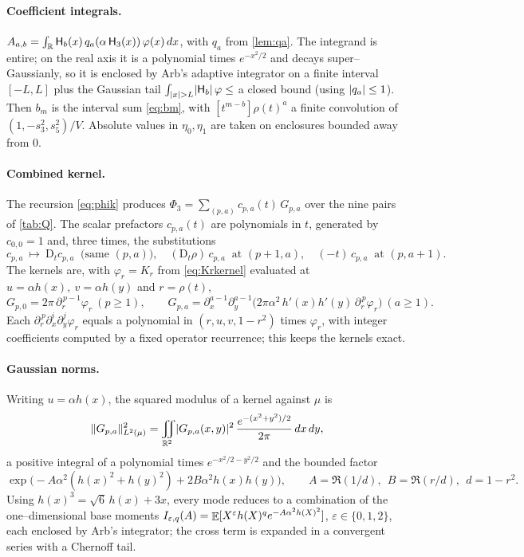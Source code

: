 \documentclass[12pt]{article}
\newcommand{\He}{\mathsf{H}}                 %
\newcommand{\Dop}{\mathrm{D}}              %
\newcommand{\Kr}{K}                          %
\begin{document}
\paragraph{Coefficient integrals.}
$A_{a,b}=\int_\R \He_b(x)\,q_a(\alpha\,\He_3(x))\,\varphi(x)\,dx$, with $q_a$ from
\cref{lem:qa}.  The integrand is entire; on the real axis it is a polynomial
times $e^{-x^2/2}$ and decays super--Gaussianly, so it is enclosed by Arb's
adaptive integrator on a finite interval $[-L,L]$ plus the Gaussian tail
$\int_{\abs x>L}\abs{\He_b}\,\varphi\le$ a closed bound (using $\lvert q_a\rvert\le1$).
Then $b_m$ is the interval sum \eqref{eq:bm}, with $[t^{m-b}]\rho(t)^a$ a finite
convolution of $(1,-s_3^2,s_5^2)/V$.  Absolute values in $\eta_0,\eta_1$ are taken
on enclosures bounded away from $0$.

\paragraph{Combined kernel.}
The recursion \eqref{eq:phik} produces $\Phi_3=\sum_{(p,a)}c_{p,a}(t)\,G_{p,a}$
over the nine pairs of \cref{tab:Q}.  The scalar prefactors $c_{p,a}(t)$ are
polynomials in $t$, generated by $c_{0,0}=1$ and, three times, the substitutions
\[
   c_{p,a}\ \longmapsto\
   \Dop_tc_{p,a}\ \text{ (same $(p,a)$)},\quad
   (\Dop_t\rho)\,c_{p,a}\ \text{ at }(p+1,a),\quad
   (-t)\,c_{p,a}\ \text{ at }(p,a+1).
\]
The kernels are, with $\varphi_r=\Kr_r$ from \eqref{eq:Krkernel} evaluated at
$u=\alpha h(x),\ v=\alpha h(y)$ and $r=\rho(t)$,
\[
   G_{p,0}=2\pi\,\partial_r^{\,p-1}\varphi_r\ (p\ge1),\qquad
   G_{p,a}=\partial_x^{a-1}\partial_y^{a-1}
           \bigl(2\pi\alpha^2\,h'(x)h'(y)\,\partial_r^{\,p}\varphi_r\bigr)\ (a\ge1).
\]
Each $\partial_r^{\,p}\partial_x^i\partial_y^j\varphi_r$ equals a polynomial in
$(r,u,v,1-r^2)$ times $\varphi_r$, with integer coefficients computed by a fixed
operator recurrence; this keeps the kernels exact.

\paragraph{Gaussian norms.}
Writing $u=\alpha h(x)$, the squared modulus of a kernel against $\mu$ is
\[
   \lVert G_{p,a}\rVert_{L^2(\mu)}^2=\iint_{\mathbb{R}^2}\lvert G_{p,a}(x,y)\rvert^2\,
        \frac{e^{-(x^2+y^2)/2}}{2\pi}\,dx\,dy,
\]
a positive integral of a polynomial times $e^{-x^2/2-y^2/2}$ and the bounded factor
\[
   \exp\!\bigl(-A\alpha^2(h(x)^2+h(y)^2)+2B\alpha^2h(x)h(y)\bigr),
   \qquad A=\Re(1/d),\ \ B=\Re(r/d),\ \ d=1-r^2 .
\]
Using $h(x)^3=\sqrt6\,h(x)+3x$, every mode reduces to a combination of the
one--dimensional base moments
$I_{\varepsilon,q}(A)=\mathop{\mathbb{E}}[X^\varepsilon h(X)^q e^{-A\alpha^2h(X)^2}]$,
$\varepsilon\in\{0,1,2\}$, each enclosed by Arb's integrator; the cross term is
expanded in a convergent series with a Chernoff tail.
\end{document}
